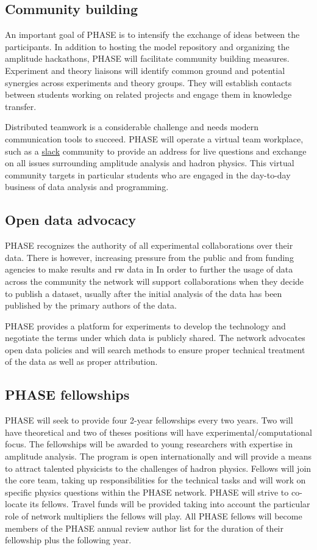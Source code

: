 \subsection{Community building}
\label{sec:community}
An important goal of PHASE is to intensify the exchange of ideas between the participants. In addition to hosting the model repository and organizing the amplitude hackathons, PHASE will facilitate community building measures. Experiment and theory liaisons will identify common ground and potential synergies across experiments and theory groups. They will establish contacts between students working on related projects and engage them in knowledge transfer.

Distributed teamwork is a considerable challenge and needs modern communication tools to succeed. PHASE will operate a virtual team workplace, such as a \href{http://slack.com}{slack} community to provide an address for live questions and exchange on all issues surrounding amplitude analysis and hadron physics. This virtual community targets in particular students who are engaged in the day-to-day business of data analysis and programming.

\subsection{Open data advocacy}
\label{sec:opendata}
PHASE recognizes the authority of all experimental collaborations over their data. There is however, increasing pressure from the public and from  funding agencies to make results and rw data in  In order to further the usage of data across the community the network will support collaborations when they decide to publish a dataset, usually after the initial analysis of the data has been published by the primary authors of the data. 

PHASE provides a platform for experiments to develop the technology and negotiate the terms under which data is publicly shared. The network advocates open data policies and will search methods to ensure proper technical treatment of the data as well as proper attribution.


\subsection{PHASE fellowships}
\label{sec:fellowships}
PHASE will seek to provide four 2-year fellowships every two years. Two will have theoretical and two of theses positions will have experimental/computational focus. The fellowships will be awarded to young researchers with expertise in amplitude analysis. The program is open internationally and will provide a means to attract talented physicists to the challenges of hadron physics. Fellows will join the core team, taking up responsibilities for the technical tasks and will work on specific physics questions within the PHASE network. PHASE will strive to co-locate its fellows. Travel funds will be provided taking into account the particular role of network multipliers the fellows will play. All PHASE fellows will become members of the PHASE annual review author list for the duration of their fellowship plus the following year.     
